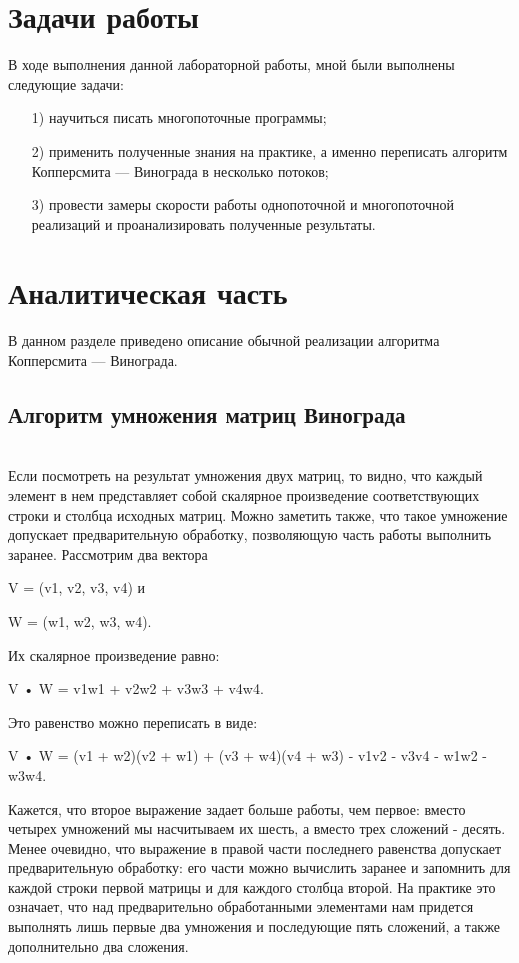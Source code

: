 \documentclass[a4paper, 14pt]{article}
\begin{document}
\newpage
\section*{Задачи работы}

В ходе выполнения данной лабораторной работы, мной были выполнены следующие задачи:

\begin{enumerate}
\item[1)] научиться писать многопоточные программы;
\item[2)] применить полученные знания на практике, а именно переписать алгоритм Копперсмита — Винограда в несколько потоков;
\item[3)] провести замеры скорости работы однопоточной и многопоточной реализаций и проанализировать полученные результаты.
\end{enumerate}


\newpage
\section{Аналитическая часть}
\hspace{1cm}	В данном разделе приведено описание обычной реализации алгоритма Копперсмита — Винограда.

\subsection {Алгоритм умножения матриц Винограда} \\

Если посмотреть на результат умножения двух матриц, то видно, что каждый элемент в нем представляет собой скалярное произведение соответствующих строки и столбца исходных матриц. Можно заметить также, что такое умножение допускает предварительную обработку, позволяющую часть работы выполнить заранее. 
Рассмотрим два вектора

V = (v1, v2, v3, v4) и

W = (w1, w2, w3, w4).

Их скалярное произведение равно: 

V • W = v1w1 + v2w2 + v3w3 + v4w4.

Это равенство можно переписать в виде: 

V • W = (v1 + w2)(v2 + w1) + (v3 + w4)(v4 + w3) - v1v2 - v3v4 - w1w2 - w3w4.

 Кажется, что второе выражение задает больше работы, чем первое: вместо четырех умножений мы насчитываем их шесть, а вместо трех сложений - десять. Менее очевидно, что выражение в правой части последнего равенства допускает предварительную обработку: его части можно вычислить заранее и запомнить для каждой строки первой матрицы и для каждого столбца второй. На практике это означает, что над предварительно обработанными элементами нам придется выполнять лишь первые два умножения и последующие пять сложений, а также дополнительно два сложения.
\\
\end{document}
